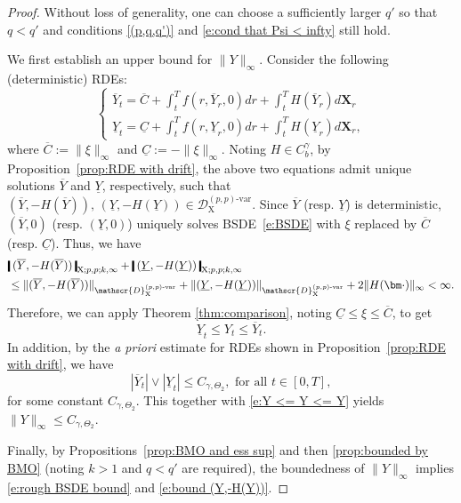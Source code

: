 \documentclass[11pt,reqno]{amsart}
\numberwithin{equation}{section}
\newcommand{\shortthickbar}{%
  \vcenter{\hbox{\rule{1.8pt}{2.2ex}}}%
}
\newcommand{\thicknm}[1]{%
  \mathopen{\shortthickbar}%
  \mkern4mu #1 \mkern4mu%
  \mathclose{\shortthickbar}%
}
\begin{document}
\begin{proof}
Without loss of generality, one can choose a sufficiently larger $q'$ so that $q < q'$ and conditions \ref{(p,q,q')} and \eqref{e:cond that Psi < infty} still hold. 

We first establish an upper bound for $\|Y\|_{\infty}$. Consider the following (deterministic) RDEs:
\begin{equation*}
\begin{cases}\displaystyle
\overline Y_{t} = \overline{C} + \int_{t}^{T}f(r,\overline Y_r,0)dr + \int_{t}^{T} H(\overline Y_r) d\mathbf X_{r}\\ \displaystyle
\underline{Y}_{t} = \underline{C} + \int_{t}^{T}f(r,\underline{Y}_r,0)dr + \int_{t}^{T} H(\underline{Y}_r) d\mathbf X_{r},
\end{cases}
\end{equation*}
where  $\overline{C} := \|\xi\|_{\infty}$ and $\underline{C} := -\|\xi\|_{\infty}$.
Noting $H \in C^{\gamma}_b$, by Proposition~\ref{prop:RDE with drift}, the above two equations admit unique solutions $\overline Y$ and $\underline{Y}$, respectively, such that $(\overline Y,-H(\overline Y)),\,(\underline{Y},-H(\underline{Y})) \in \mathscr{D}^{(p,p)\text{-}\mathrm{var}}_{\mathrm X}$.
Since $\overline Y$ (resp. $\underline{Y}$) is deterministic, $(\overline Y,0)$ (resp. $(\underline{Y},0)$) uniquely solves BSDE~\eqref{e:BSDE} with $\xi$ replaced by $\overline{C}$ (resp. $\underline{C}$). Thus, we have 
\begin{equation*}
\begin{aligned}
&\thicknm{(\overline Y,-H(\overline Y))}_{\mathrm X;p,p;k,\infty} + \thicknm{(\underline{Y},-H(\underline{Y}))}_{\mathrm X;p,p;k,\infty} \\
&\le \|(\overline Y,-H(\overline Y))\|_{\mathscr{D}^{(p,p)\text{-}\mathrm{var}}_{\mathrm X}} + \|(\underline{Y},-H(\underline{Y}))\|_{\mathscr{D}^{(p,p)\text{-}\mathrm{var}}_{\mathrm X}} + 2\|H(\bm\cdot)\|_{\infty} < \infty. 
\end{aligned}
\end{equation*}
Therefore, we can apply Theorem \ref{thm:comparison}, noting $\underline{C} \le \xi \le \overline{C}$, to get
\begin{equation}\label{e:Y <= Y <= Y} 
\underline{Y}_t \le Y_t \le \overline Y_t.
\end{equation}
In addition, by the \emph{a priori} estimate for RDEs shown in Proposition~\ref{prop:RDE with drift}, we have 
\begin{equation*}
|\overline Y_t| \vee |\underline{Y}_t| \le C_{\gamma,\Theta_2}, \text{ for all } t\in[0,T],
\end{equation*}
for some constant $C_{\gamma,\Theta_2}$. This together with \eqref{e:Y <= Y <= Y} yields $\|Y\|_\infty\le C_{\gamma,\Theta_2}$. 

Finally, by Propositions~\ref{prop:BMO and ess sup} and then \ref{prop:bounded by BMO}  (noting $k > 1$ and $q < q'$ are required), the boundedness of $\|Y\|_{\infty}$ implies \eqref{e:rough BSDE bound} and \eqref{e:bound (Y,-H(Y))}.
\end{proof}
\end{document}
